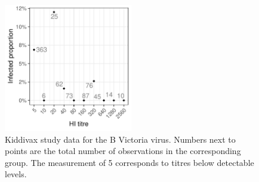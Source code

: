 \begin{figure}[htp]
    \centering
    \includegraphics[width=0.5\textwidth]{../data-plot/kiddyvax-main-summ.pdf}
    \caption{
        Kiddivax study data for the B Victoria virus. Numbers next to points are the total number of observations in the corresponding group. The measurement of 5 corresponds to titres below detectable levels.
    }
    \label{fig:kiddivax-main-summ}
\end{figure}
